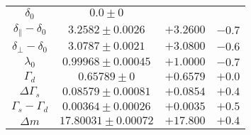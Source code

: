 \documentclass[aspectratio=43,9pt]{beamer}
\begin{document}
\begin{frame}[default]
\begin{tabular}{cccc}
    $                      \delta_0 $&$                 0.0 \pm 0 $\\
    $ \delta_{\parallel} - \delta_0 $&$         3.2582 \pm 0.0026 $&$ +3.2600 $&$ -0.7 $\\
    $     \delta_{\perp} - \delta_0 $&$         3.0787 \pm 0.0021 $&$ +3.0800 $&$ -0.6 $\\
    $                     \lambda_0 $&$       0.99968 \pm 0.00045 $&$ +1.0000 $&$ -0.7 $\\
    $                      \Gamma_d $&$             0.65789 \pm 0 $&$ +0.6579 $&$ +0.0 $\\
    $                \Delta\Gamma_s $&$       0.08579 \pm 0.00081 $&$ +0.0854 $&$ +0.4 $\\
    $           \Gamma_s - \Gamma_d $&$       0.00364 \pm 0.00026 $&$ +0.0035 $&$ +0.5 $\\
    $                      \Delta m $&$      17.80031 \pm 0.00072 $&$ +17.800 $&$ +0.4 $\\
  \hline
  \end{tabular}


  
\end{frame}

\end{document}
